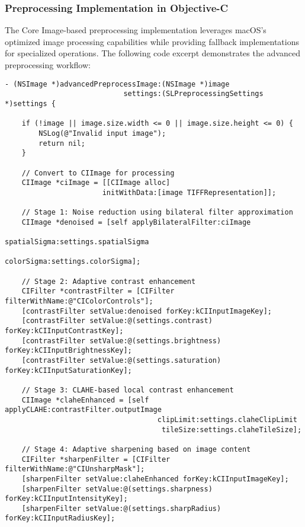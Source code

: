 \subsubsection{Preprocessing Implementation in Objective-C}

The Core Image-based preprocessing implementation leverages macOS's optimized image processing capabilities while providing fallback implementations for specialized operations. The following code excerpt demonstrates the advanced preprocessing workflow:

\begin{verbatim}
- (NSImage *)advancedPreprocessImage:(NSImage *)image 
                            settings:(SLPreprocessingSettings *)settings {
    
    if (!image || image.size.width <= 0 || image.size.height <= 0) {
        NSLog(@"Invalid input image");
        return nil;
    }
    
    // Convert to CIImage for processing
    CIImage *ciImage = [[CIImage alloc] 
                       initWithData:[image TIFFRepresentation]];
    
    // Stage 1: Noise reduction using bilateral filter approximation
    CIImage *denoised = [self applyBilateralFilter:ciImage 
                                       spatialSigma:settings.spatialSigma
                                          colorSigma:settings.colorSigma];
    
    // Stage 2: Adaptive contrast enhancement
    CIFilter *contrastFilter = [CIFilter filterWithName:@"CIColorControls"];
    [contrastFilter setValue:denoised forKey:kCIInputImageKey];
    [contrastFilter setValue:@(settings.contrast) forKey:kCIInputContrastKey];
    [contrastFilter setValue:@(settings.brightness) forKey:kCIInputBrightnessKey];
    [contrastFilter setValue:@(settings.saturation) forKey:kCIInputSaturationKey];
    
    // Stage 3: CLAHE-based local contrast enhancement
    CIImage *claheEnhanced = [self applyCLAHE:contrastFilter.outputImage 
                                    clipLimit:settings.claheClipLimit
                                     tileSize:settings.claheTileSize];
    
    // Stage 4: Adaptive sharpening based on image content
    CIFilter *sharpenFilter = [CIFilter filterWithName:@"CIUnsharpMask"];
    [sharpenFilter setValue:claheEnhanced forKey:kCIInputImageKey];
    [sharpenFilter setValue:@(settings.sharpness) forKey:kCIInputIntensityKey];
    [sharpenFilter setValue:@(settings.sharpRadius) forKey:kCIInputRadiusKey];
    

\end{verbatim}
